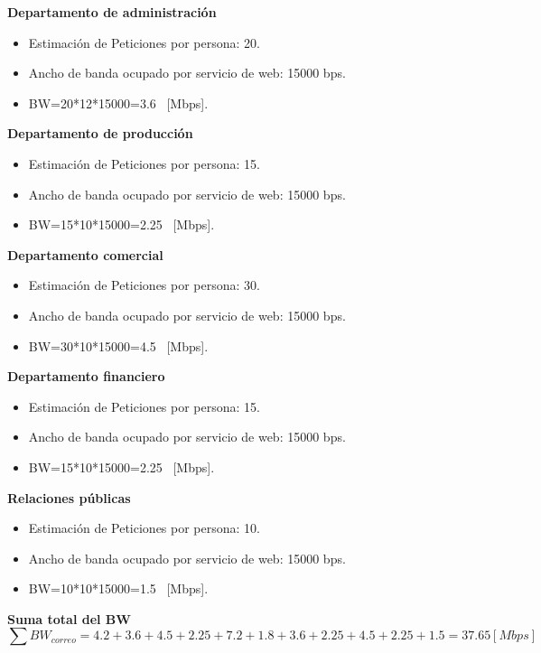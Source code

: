 \documentclass[12pt,letterpaper]{article}
\begin{document}
\textbf{Departamento de administración}
\begin{itemize}
    \item Estimación de Peticiones por persona: 20. 
    \item Ancho de banda ocupado por servicio de web: 15000 bps.
    \item BW=20*12*15000=3.6 \ [Mbps].
\end{itemize}
\textbf{Departamento de producción}
\begin{itemize}
    \item Estimación de Peticiones por persona: 15. 
    \item Ancho de banda ocupado por servicio de web: 15000 bps.
    \item BW=15*10*15000=2.25 \ [Mbps].
\end{itemize}
\textbf{Departamento comercial}
\begin{itemize}
    \item Estimación de Peticiones por persona: 30. 
    \item Ancho de banda ocupado por servicio de web: 15000 bps.
    \item BW=30*10*15000=4.5 \ [Mbps].
\end{itemize}
\textbf{Departamento financiero}
\begin{itemize}
    \item Estimación de Peticiones por persona: 15. 
    \item Ancho de banda ocupado por servicio de web: 15000 bps.
    \item BW=15*10*15000=2.25 \ [Mbps].
\end{itemize}
\textbf{Relaciones públicas}
\begin{itemize}
    \item Estimación de Peticiones por persona: 10. 
    \item Ancho de banda ocupado por servicio de web: 15000 bps.
    \item BW=10*10*15000=1.5 \ [Mbps].
\end{itemize}
\textbf{Suma total del BW}
\begin{equation}
    \sum BW_{correo}=4.2+3.6+4.5+2.25+7.2+1.8+3.6+2.25+4.5+2.25+1.5=37.65[Mbps]
\end{equation}

\newpage
\end{document}

